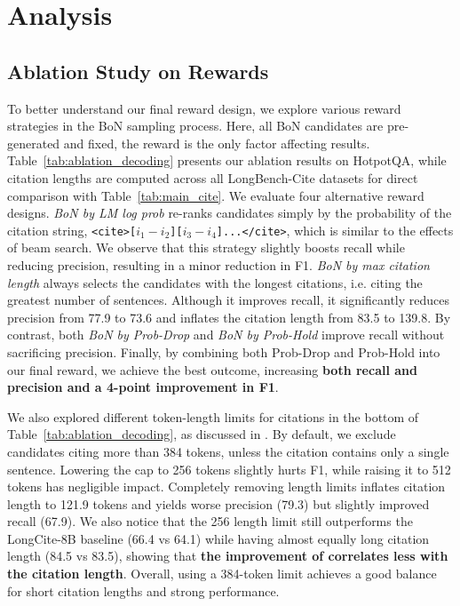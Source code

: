 \section{Analysis}
\subsection{Ablation Study on Rewards}
\label{sec:ablation}

To better understand our final reward design, we explore various reward strategies in the BoN sampling process. Here, all BoN candidates are pre-generated and fixed, the reward is the only factor affecting results. Table~\ref{tab:ablation_decoding} presents our ablation results on HotpotQA, while citation lengths are computed across all LongBench-Cite datasets for direct comparison with Table~\ref{tab:main_cite}.
We evaluate four alternative reward designs. \textit{BoN by LM log prob} re-ranks candidates simply by the probability of the citation string, \texttt{\small <cite>[}$i_1-i_2$\texttt{\small ][}$i_3-i_4$\texttt{\small ]...</cite>}, which is similar to the effects of beam search. We observe that this strategy slightly boosts recall while reducing precision, resulting in a minor reduction in F1. 
\textit{BoN by max citation length} always selects the candidates with the longest citations, i.e. citing the greatest number of sentences. Although it improves recall, it significantly reduces precision from 77.9 to 73.6 and inflates the citation length from 83.5 to 139.8. 
By contrast, both \textit{BoN by Prob-Drop} and \textit{BoN by Prob-Hold} improve recall without sacrificing precision. 
Finally, by combining both Prob-Drop and Prob-Hold into our final \ours reward, we achieve the best outcome, increasing \textbf{both recall and precision and a 4-point improvement in F1}.

We also explored different token-length limits for citations in the bottom of Table~\ref{tab:ablation_decoding}, as discussed in . By default, we exclude candidates citing more than 384 tokens, unless the citation contains only a single sentence. Lowering the cap to 256 tokens slightly hurts F1, while raising it to 512 tokens has negligible impact. Completely removing length limits inflates citation length to 121.9 tokens and yields worse precision (79.3) but slightly improved recall (67.9). We also notice that the 256 length limit still outperforms the LongCite-8B baseline (66.4 vs 64.1) while having almost equally long citation length (84.5 vs 83.5), showing that \textbf{the improvement of \ours correlates less with the citation length}.
Overall, using a 384-token limit achieves a good balance for short citation lengths and strong performance.


